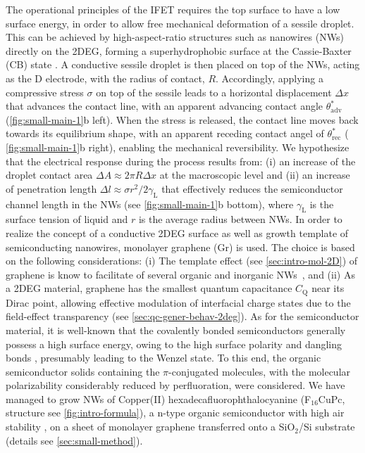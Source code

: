 The operational principles of the IFET requires the top surface to
have a low surface energy, in order to allow free mechanical
deformation of a sessile droplet.
%
This can be achieved by high-aspect-ratio structures such as nanowires (NWs)~\cite{Yang_2010_rev_NW} directly on the 2DEG,
forming a superhydrophobic surface at the Cassie-Baxter (CB) state
\cite{Cassie_1944_wet}.
%
A conductive sessile droplet is then placed on top
of the NWs, acting as the D electrode, with the radius of contact,
\(R\).
%
Accordingly, applying a compressive stress \(\sigma\) on top
of the sessile leads to a horizontal displacement \(\Delta x\) that
advances the contact line, with an apparent advancing contact angle
\(\theta_{\mathrm{adv}}^{*}\) (\autoref{fig:small-main-1}b left).
%
When the
stress is released, the contact line moves back towards its
equilibrium shape, with an apparent receding contact angel of
\(\theta_{\mathrm{rec}}^{*}\) ( \autoref{fig:small-main-1}b right), enabling the
mechanical reversibility.
%
We hypothesize that the electrical response during the
process results from: (i) an increase of the droplet contact area
\(\Delta A \approx 2 \pi R \Delta x\) at the macroscopic level and (ii)
an increase of penetration length \(\Delta l \approx \sigma
r^{2}/2\gamma_{\mathrm{L}}\) that effectively reduces the semiconductor
channel length in the NWs (see  \autoref{fig:small-main-1}b bottom), where
\(\gamma_{\mathrm{L}}\) is the surface tension of liquid and \(r\) is the
average radius between NWs.
%
In order to realize the concept of a conductive 2DEG surface as well
as growth template of semiconducting nanowires, monolayer graphene (Gr) is used.
%
The choice is based on the following considerations: (i) The template
effect (see \autoref{sec:intro-mol-2D}) of graphene is know to
facilitate of several organic and inorganic
NWs~\cite{Huang_2016_laury_nanowire_gr,Wang_2015_vertical_nanowire_gr,Fu_2012_gr_ZnONW},
and (ii) As a 2DEG material, graphene has the smallest quantum
capacitance $C_{\mathrm{Q}}$ near its Dirac point, allowing effective
modulation of interfacial charge states due to the field-effect
transparency (see \autoref{sec:qc-gener-behav-2deg}).
%
As for the semiconductor material, it is well-known
that the covalently bonded semiconductors generally possess a high
surface energy, owing to the high surface polarity
\cite{Azimi_2013_wetting_RO} and dangling bonds
\cite{Zhang_2004_dangling}, presumably leading to the Wenzel state.
%
To
this end, the organic semiconductor solids containing the
\(\pi\)-conjugated molecules, with the molecular polarizability
considerably reduced by perfluoration, were considered.
%
We have managed to grow NWs of Copper(II) hexadecafluorophthalocyanine
(F\(_{\text{16}}\)CuPc, structure see \autoref{fig:intro-formula}), a
n-type organic semiconductor with high air stability
\cite{Bao_1998_FCuPC}, on a sheet of monolayer graphene transferred
onto a SiO\(_{\text{2}}\)/Si substrate (details see
\autoref{sec:small-method}).

